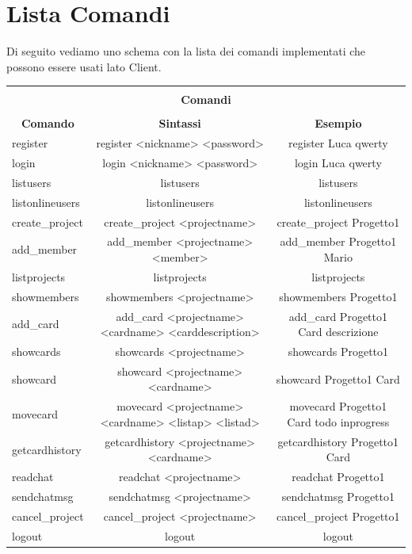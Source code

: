 \documentclass{article} %
\begin{document}
\section{Lista Comandi}
Di seguito vediamo uno schema con la lista dei comandi implementati che possono essere usati lato Client. \\

\hspace{-1.7 cm}
\begin{tabular}{|l|c|c|}
\hline
\multicolumn{3}{|c|}{}\\
\multicolumn{3}{|c|}{\textbf{\Large Comandi}}\\
\multicolumn{3}{|c|}{}\\
\hline
\multicolumn{1}{|c|}{\textbf{Comando}} & \textbf{Sintassi} &
\multicolumn{1}{c|}{\textbf{Esempio}}\\
\hline
register & register <nickname> <password>  & register Luca qwerty \\
login & login <nickname> <password> & login Luca qwerty \\
listusers & listusers & listusers \\
listonlineusers & listonlineusers & listonlineusers \\
create\_project & create\_project <projectname> & create\_project Progetto1 \\
add\_member & add\_member <projectname> <member> & add\_member Progetto1 Mario \\
listprojects & listprojects & listprojects \\
showmembers & showmembers <projectname> & showmembers Progetto1 \\
add\_card & add\_card <projectname> <cardname> <carddescription> & add\_card Progetto1 Card descrizione \\
showcards & showcards <projectname> & showcards Progetto1 \\
showcard & showcard <projectname> <cardname> & showcard Progetto1 Card \\
movecard & movecard <projectname> <cardname> <listap> <listad> & movecard Progetto1 Card todo inprogress \\
getcardhistory & getcardhistory <projectname> <cardname> & getcardhistory Progetto1 Card \\
readchat & readchat <projectname> & readchat Progetto1 \\
sendchatmsg & sendchatmsg <projectname> & sendchatmsg Progetto1 \\
cancel\_project & cancel\_project <projectname> & cancel\_project Progetto1 \\
logout & logout & logout \\
\hline
\end{tabular}
\end{document}
